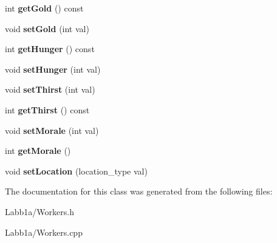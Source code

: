 \begin{DoxyCompactItemize}
\item 
\hypertarget{class_workers_ad78c8b7ad9e6ea6ba3e8390eb5dc6498}{}int {\bfseries get\+Gold} () const \label{class_workers_ad78c8b7ad9e6ea6ba3e8390eb5dc6498}

\item 
\hypertarget{class_workers_a262c75ba2323327078ce2637d28d038a}{}void {\bfseries set\+Gold} (int val)\label{class_workers_a262c75ba2323327078ce2637d28d038a}

\item 
\hypertarget{class_workers_ae429543b8429ea7c52245e3c064c13ae}{}int {\bfseries get\+Hunger} () const \label{class_workers_ae429543b8429ea7c52245e3c064c13ae}

\item 
\hypertarget{class_workers_a2cd4cda944d4bf866a84940a35d598d8}{}void {\bfseries set\+Hunger} (int val)\label{class_workers_a2cd4cda944d4bf866a84940a35d598d8}

\item 
\hypertarget{class_workers_ad38a7b221ccbc9a705d4b14456ed5349}{}void {\bfseries set\+Thirst} (int val)\label{class_workers_ad38a7b221ccbc9a705d4b14456ed5349}

\item 
\hypertarget{class_workers_a2433e1d05f859980b8e37e64387d40ad}{}int {\bfseries get\+Thirst} () const \label{class_workers_a2433e1d05f859980b8e37e64387d40ad}

\item 
\hypertarget{class_workers_ae5dda4a3ee4766b4ecfce3b0485e1dda}{}void {\bfseries set\+Morale} (int val)\label{class_workers_ae5dda4a3ee4766b4ecfce3b0485e1dda}

\item 
\hypertarget{class_workers_aa1a129d2756bfa958916daf90e238f79}{}int {\bfseries get\+Morale} ()\label{class_workers_aa1a129d2756bfa958916daf90e238f79}

\item 
\hypertarget{class_workers_a95f49aa88ac7ee4db593e67ecd6093b9}{}void {\bfseries set\+Location} (location\+\_\+type val)\label{class_workers_a95f49aa88ac7ee4db593e67ecd6093b9}

\end{DoxyCompactItemize}


The documentation for this class was generated from the following files\+:\begin{DoxyCompactItemize}
\item 
Labb1a/Workers.\+h\item 
Labb1a/Workers.\+cpp\end{DoxyCompactItemize}
